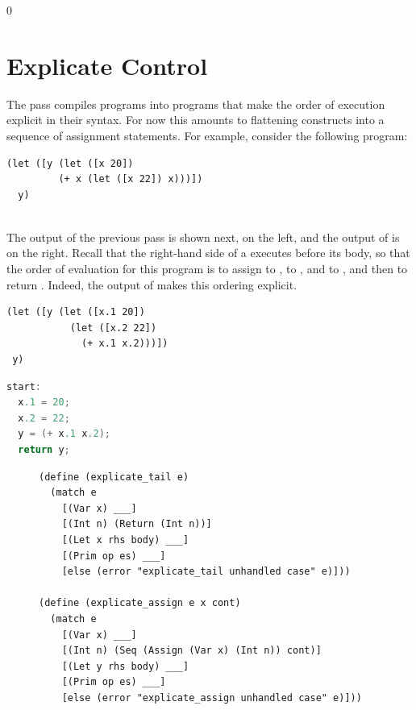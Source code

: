 \documentclass[7x10]{TimesAPriori_MIT}%
\def\racketEd{0}
\providecommand{\BookEdition}{1}
\let\edition\BookEdition
\numberwithin{theorem}{chapter}
\numberwithin{definition}{chapter}
\numberwithin{equation}{chapter}
\begin{document}
{\if\edition\racketEd  
\section{Explicate Control}
\label{sec:explicate-control-Lvar}

The  pass compiles \LangVarANF{} programs into \LangCVar{}
programs that make the order of execution explicit in their
syntax. For now this amounts to flattening  constructs into a
sequence of assignment statements. For example, consider the following
\LangVar{} program:\\
\begin{minipage}{0.96\textwidth}
\begin{lstlisting}
(let ([y (let ([x 20])
         (+ x (let ([x 22]) x)))])
  y)
\end{lstlisting}
\end{minipage}\\
%
The output of the previous pass is shown next, on the left, and the
output of  is on the right. Recall that the
right-hand side of a  executes before its body, so that the order
of evaluation for this program is to assign  to ,
 to , and  to , and then to
return . Indeed, the output of  makes
this ordering explicit.
\begin{transformation}
\begin{lstlisting}
(let ([y (let ([x.1 20]) 
           (let ([x.2 22])
             (+ x.1 x.2)))])
 y)
\end{lstlisting}
\compilesto
\begin{lstlisting}[language=C]
start:
  x.1 = 20;
  x.2 = 22;
  y = (+ x.1 x.2);
  return y;
\end{lstlisting}
\end{transformation}

\begin{figure}[tbp]
\begin{tcolorbox}[colback=white]
\begin{lstlisting}
(define (explicate_tail e)
  (match e
    [(Var x) ___]
    [(Int n) (Return (Int n))]
    [(Let x rhs body) ___]
    [(Prim op es) ___]
    [else (error "explicate_tail unhandled case" e)]))

(define (explicate_assign e x cont)
  (match e
    [(Var x) ___]
    [(Int n) (Seq (Assign (Var x) (Int n)) cont)]
    [(Let y rhs body) ___]
    [(Prim op es) ___]
    [else (error "explicate_assign unhandled case" e)]))


\end{lstlisting}
\end{tcolorbox}
\end{figure}}
\end{document}
